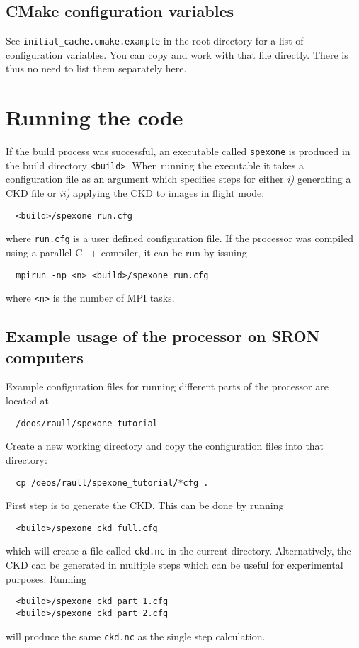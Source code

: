 \documentclass{article}
\begin{document}
\subsection{\label{sec:cmake_configuration}CMake configuration variables}

See \lstinline!initial_cache.cmake.example! in the root directory for a list of configuration variables. You can copy and work with that file directly. There is thus no need to list them separately here.

\section{Running the code}

If the build process was successful, an executable called \lstinline!spexone! is produced in the build directory \lstinline!<build>!. When running the executable it takes a configuration file as an argument which specifies steps for either \textit{i)} generating a CKD file or \textit{ii)} applying the CKD to images in flight mode:
\begin{lstlisting}
  <build>/spexone run.cfg
\end{lstlisting}
where \lstinline!run.cfg! is a user defined configuration file. If the processor was compiled using a parallel C++ compiler, it can be run by issuing
\begin{lstlisting}
  mpirun -np <n> <build>/spexone run.cfg
\end{lstlisting}
where \lstinline!<n>! is the number of MPI tasks.

\subsection{Example usage of the processor on SRON computers}

Example configuration files for running different parts of the processor are located at
\begin{lstlisting}
  /deos/raull/spexone_tutorial
\end{lstlisting}
Create a new working directory and copy the configuration files into that directory:
\begin{lstlisting}
  cp /deos/raull/spexone_tutorial/*cfg .
\end{lstlisting}
First step is to generate the CKD. This can be done by running
\begin{lstlisting}
  <build>/spexone ckd_full.cfg
\end{lstlisting}
which will create a file called \lstinline!ckd.nc! in the current directory. Alternatively, the CKD can be generated in multiple steps which can be useful for experimental purposes. Running
\begin{lstlisting}
  <build>/spexone ckd_part_1.cfg
  <build>/spexone ckd_part_2.cfg
\end{lstlisting}
will produce the same \lstinline!ckd.nc! as the single step calculation.
\end{document}
